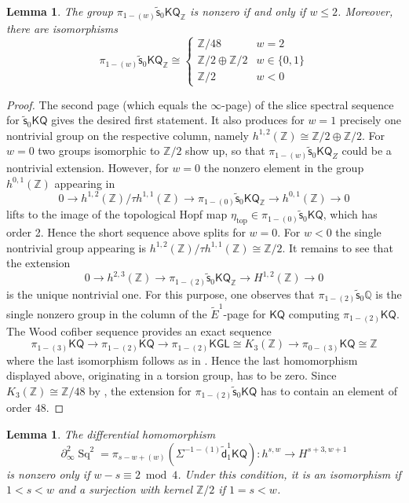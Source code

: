 \documentclass[11pt,hyp,english]{article}
\newcommand{\Z}{\mathbb{Z}}
\newcommand{\Q}{\mathbb{Q}}
\newcommand{\KGL}{\mathsf{KGL}}
\newcommand{\KQ}{\mathsf{KQ}}
\newcommand{\Sq}{\operatorname{Sq}}
\newcommand{\vs}{\tilde{\mathsf{s}}}
\newcommand{\vd}{{\tilde{\mathsf{d}}}}
\let\iso=\cong
\newtheorem{lemma}[theorem]{Lemma}
\theoremstyle{definition}
\begin{document}
\begin{lemma}\label{lem:pi1V}
The group $\pi_{1-(w)}\vs_0\KQ_\Z$ is nonzero if and only if $w\leq 2$.
Moreover, there are isomorphisms 
\[ \pi_{1-(w)}\vs_0\KQ_\Z\iso \begin{cases} \Z/48 & w=2 \\\Z/2\oplus \Z/2 & w\in \{0,1\} \\ \Z/2 & w<0\end{cases}\]
\end{lemma}
\begin{proof}
    The second page (which equals the $\infty$-page) of the slice spectral sequence for $\vs_0\KQ$ gives the desired first statement. 
    It also produces for $w=1$ precisely one nontrivial group on the respective column, namely $h^{1,2}(\Z)\iso \Z/2\oplus \Z/2$.
    For $w=0$ two groups isomorphic to $\Z/2$ show up, so that $\pi_{1-(w)}\vs_0\KQ_Z$ could be a nontrivial extension. 
    However, for $w=0$ the nonzero element in the group $h^{0,1}(\Z)$ appearing in 
    \[ 0 \to h^{1,2}(\Z)/\tau h^{1,1}(\Z) \to \pi_{1-(0)}\vs_0\KQ_\Z \to h^{0,1}(\Z)\to 0\]
    lifts to the image of the topological Hopf map $\eta_{\mathrm{top}}\in \pi_{1-(0)}\vs_0\KQ$, which has order 2.
    Hence the short sequence above splits for $w=0$. 
    For $w<0$ the single nontrivial group appearing is $h^{1,2}(\Z)/\tau h^{1,1}(\Z)\iso \Z/2$.
    It remains to see that the extension 
    \[ 0 \to h^{2,3}(\Z)\to \pi_{1-(2)}\vs_0\KQ_\Z \to H^{1,2}(\Z) \to 0\]
    is the unique nontrivial one.
    For this purpose, one observes that $\pi_{1-(2)}\vs_0\Q$ is the single nonzero group in the column of the $\tilde{E}^1$-page for $\KQ$ computing $\pi_{1-(2)}\KQ$. 
    The Wood cofiber sequence provides an exact sequence
    \[ \pi_{1-(3)}\KQ\to \pi_{1-(2)}\KQ \to \pi_{1-(2)}\KGL\cong K_3(\Z) \to \pi_{0-(3)}\KQ\cong \Z\]
    where the last isomorphism follows as in . 
    Hence the last homomorphism displayed above, originating in a torsion group, has to be zero.
    Since $K_3(\Z)\cong \Z/48$ by \cite{lee-szczarba}, the extension for $\pi_{1-(2)}\vs_0\KQ$ has to contain an element of order $48$.
\end{proof}

\begin{lemma}\label{lem:more-vd1-iso}
The differential homomorphism 
\[ \partial^2_\infty\Sq^2 =\pi_{s-w+(w)}(\Sigma^{-1-(1)}\vd^1_1\KQ)\colon h^{s,w}\to H^{s+3,w+1}\]
is nonzero only if $w-s\equiv 2 \bmod 4$.
Under this condition, it is an isomorphism if $1<s<w$ and a surjection with kernel $\Z/2$ if $1=s<w$.
\end{lemma}
\end{document}
